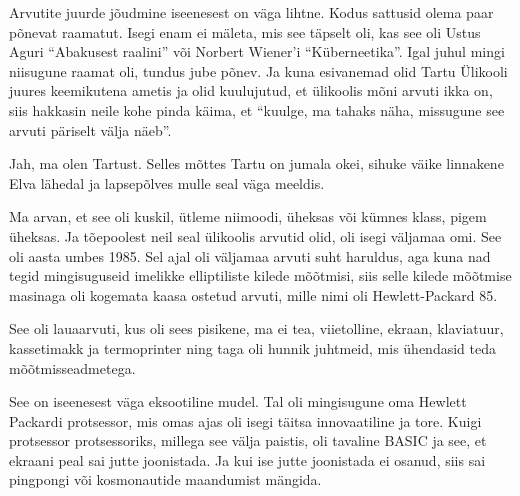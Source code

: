 

Arvutite juurde jõudmine iseenesest on väga lihtne. Kodus sattusid olema paar 
põnevat raamatut. Isegi enam ei mäleta, mis see täpselt oli, kas see oli Ustus 
Aguri \enquote{Abakusest raalini} või Norbert Wiener'i \enquote{Küberneetika}. Igal juhul mingi niisugune raamat oli, tundus jube põnev. Ja 
 kuna esivanemad olid Tartu Ülikooli juures keemikutena 
ametis ja olid kuulujutud, et ülikoolis mõni arvuti ikka on, siis hakkasin 
neile kohe pinda käima, et \enquote{kuulge, ma tahaks näha, missugune see 
arvuti päriselt välja näeb}.


Jah, ma olen Tartust. Selles mõttes Tartu on jumala okei, sihuke  väike 
linnakene Elva lähedal ja lapsepõlves mulle seal väga meeldis. 


Ma arvan, et see oli kuskil, ütleme niimoodi, üheksas või kümnes klass, pigem 
üheksas. Ja tõepoolest neil seal ülikoolis arvutid olid, oli isegi väljamaa 
omi. See oli aasta umbes 1985. Sel ajal oli  väljamaa arvuti  suht  haruldus, 
aga kuna nad tegid mingisuguseid imelikke elliptiliste kilede mõõtmisi, siis 
selle kilede mõõtmise masinaga oli kogemata kaasa ostetud  arvuti, mille nimi 
oli Hewlett-Packard 85. 


See oli lauaarvuti, kus oli sees pisikene, ma ei tea, viietolline, ekraan, 
klaviatuur, kassetimakk ja termoprinter ning taga oli hunnik juhtmeid, mis 
ühendasid teda mõõtmisseadmetega.


See on iseenesest väga eksootiline mudel. Tal oli mingisugune oma Hewlett 
Packardi protsessor, mis  omas ajas oli isegi täitsa innovaatiline ja 
tore. Kuigi protsessor protsessoriks, millega see välja paistis, oli tavaline 
BASIC ja see, et ekraani peal sai jutte joonistada. Ja kui 
ise jutte joonistada ei osanud, siis sai pingpongi või kosmonautide maandumist 
mängida. 

